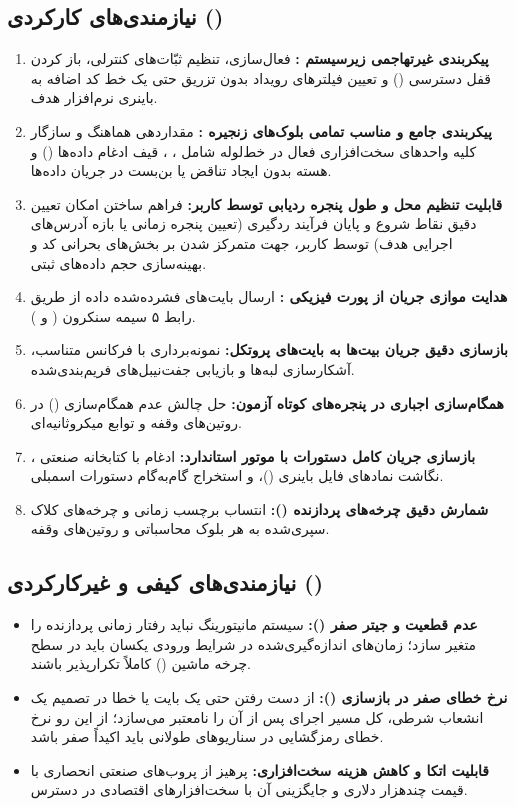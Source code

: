 \subsection{نیازمندی‌های کارکردی ()}
\begin{enumerate}
    \item \textbf{پیکربندی غیرتهاجمی زیرسیستم :} فعال‌سازی، تنظیم ثبّات‌های کنترلی، باز کردن قفل دسترسی () و تعیین فیلترهای رویداد بدون تزریق حتی یک خط کد اضافه به باینری نرم‌افزار هدف.
    \item \textbf{پیکربندی جامع و مناسب تمامی بلوک‌های زنجیره :} مقداردهی هماهنگ و سازگار کلیه واحدهای سخت‌افزاری فعال در خط‌لوله شامل ، ، قیف ادغام داده‌ها () و هسته  بدون ایجاد تناقض یا بن‌بست در جریان داده‌ها.
    \item \textbf{قابلیت تنظیم محل و طول پنجره ردیابی توسط کاربر:} فراهم ساختن امکان تعیین دقیق نقاط شروع و پایان فرآیند ردگیری (تعیین پنجره زمانی یا بازه آدرس‌های اجرایی هدف) توسط کاربر، جهت متمرکز شدن بر بخش‌های بحرانی کد و بهینه‌سازی حجم داده‌های ثبتی.
    \item \textbf{هدایت موازی جریان  از پورت فیزیکی :} ارسال بایت‌های فشرده‌شده داده از طریق رابط ۵ سیمه سنکرون ( و ).
    \item \textbf{بازسازی دقیق جریان بیت‌ها به بایت‌های پروتکل:} نمونه‌برداری با فرکانس متناسب، آشکارسازی لبه‌ها و بازیابی جفت‌نیبل‌های فریم‌بندی‌شده.
    \item \textbf{همگام‌سازی اجباری در پنجره‌های کوتاه آزمون:} حل چالش عدم همگام‌سازی () در روتین‌های وقفه و توابع میکروثانیه‌ای.
    \item \textbf{بازسازی جریان کامل دستورات با موتور استاندارد:} ادغام با کتابخانه صنعتی ، نگاشت نمادهای فایل باینری ()، و استخراج گام‌به‌گام دستورات اسمبلی.
    \item \textbf{شمارش دقیق چرخه‌های پردازنده ():} انتساب برچسب زمانی و چرخه‌های کلاک سپری‌شده به هر بلوک محاسباتی و روتین‌های وقفه.
\end{enumerate}

\subsection{نیازمندی‌های کیفی و غیرکارکردی ()}
\begin{itemize}
    \item \textbf{عدم قطعیت و جیتر صفر ():} سیستم مانیتورینگ نباید رفتار زمانی پردازنده را متغیر سازد؛ زمان‌های اندازه‌گیری‌شده در شرایط ورودی یکسان باید در سطح چرخه ماشین () کاملاً تکرارپذیر باشند.
    \item \textbf{نرخ خطای صفر در بازسازی ():} از دست رفتن حتی یک بایت یا خطا در تصمیم یک انشعاب شرطی، کل مسیر اجرای پس از آن را نامعتبر می‌سازد؛ از این رو نرخ خطای رمزگشایی در سناریوهای طولانی باید اکیداً صفر باشد.
    \item \textbf{قابلیت اتکا و کاهش هزینه سخت‌افزاری:} پرهیز از پروب‌های صنعتی انحصاری با قیمت چندهزار دلاری و جایگزینی آن با سخت‌افزارهای اقتصادی در دسترس.
\end{itemize}

